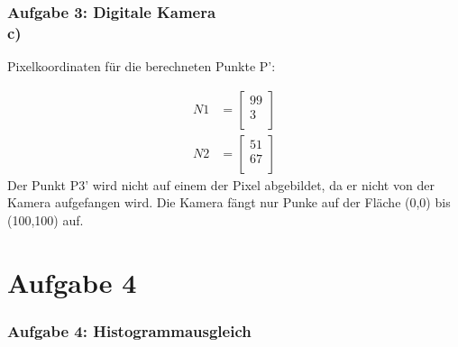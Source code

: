 \documentclass[accentcolor=tud9c,colorbacktitle,inverttitle,landscape,german,presentation,t]{tudbeamer}
\begin{document}
	\begin{frame}
		\frametitle{Aufgabe 3: Digitale Kamera \\ c)}
		
		Pixelkoordinaten f\"ur die berechneten Punkte P':
		
		\begin{align*}
		N1 &=
		\begin{bmatrix}
		99 \\
		3  \\
		\end{bmatrix}
		\end{align*}
		\begin{align*}
		N2 &=
		\begin{bmatrix}
		51 \\
		67  \\
		\end{bmatrix}
		\end{align*}
		Der Punkt P3' wird nicht auf einem der Pixel abgebildet, da er nicht von der Kamera aufgefangen wird. Die Kamera f\"angt nur Punke auf der Fl\"ache (0,0) bis (100,100) auf.
		
	\end{frame}
\section{Aufgabe 4}
	\begin{frame}[t]
		\frametitle{Aufgabe 4: Histogrammausgleich}
	\end{frame}
\end{document}
